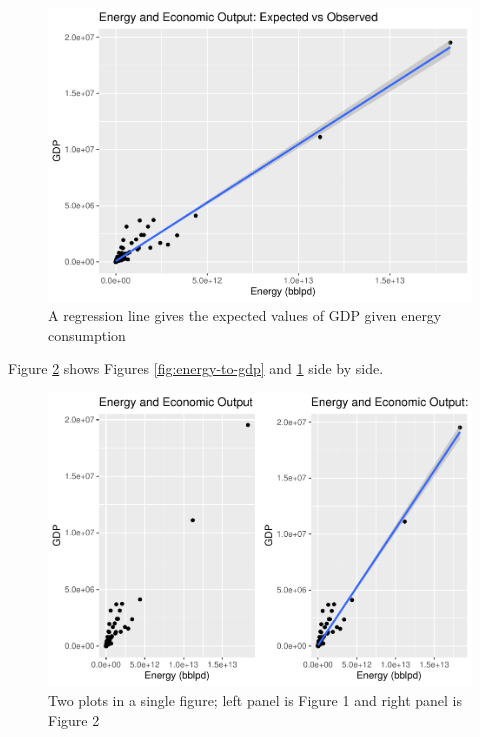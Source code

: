 \documentclass[]{elsarticle} %
\makeatletter
\def\maxwidth{\ifdim\Gin@nat@width>\linewidth\linewidth
\else\Gin@nat@width\fi}
\let\Oldincludegraphics\includegraphics
\renewcommand{\includegraphics}[1]{\Oldincludegraphics[width=\maxwidth]{#1}}
\makeatother
\begin{document}
\begin{figure}
\centering
\includegraphics{Elsevier-Template_files/figure-latex/fig-energy-to-gdp-with-line-1.pdf}
\caption{\label{fig:energy-to-gdp-with-line} A regression line gives the
expected values of GDP given energy consumption}
\end{figure}

Figure \ref{fig:right-left-panel-plot} shows Figures
\ref{fig:energy-to-gdp} and \ref{fig:energy-to-gdp-with-line} side by
side.

\begin{figure}
\centering
\includegraphics{Elsevier-Template_files/figure-latex/fig-right-left-panel-plot-1.pdf}
\caption{\label{fig:right-left-panel-plot} Two plots in a single figure;
left panel is Figure 1 and right panel is Figure 2}
\end{figure}
\end{document}

